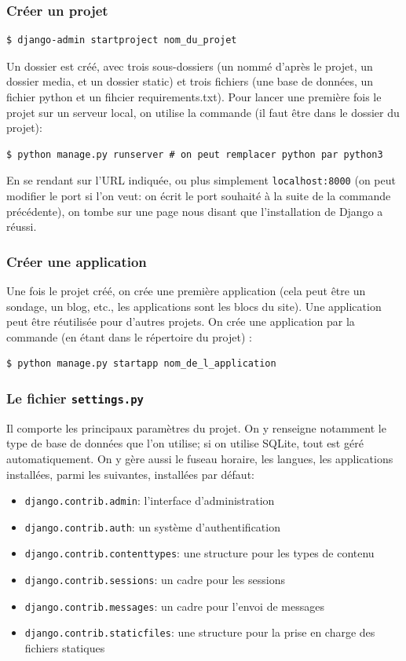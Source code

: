 \documentclass[a4paper, 10pt]{article}
\begin{document}
\subsubsection{Créer un projet}
\begin{verbatim}
$ django-admin startproject nom_du_projet
\end{verbatim}

Un dossier est créé, avec trois sous-dossiers (un nommé d'après le projet, un dossier media, et un dossier static) et trois fichiers (une base de données, un fichier python et un fihcier requirements.txt). Pour lancer une première fois le projet sur un serveur local, on utilise la commande (il faut être dans le dossier du projet):
\begin{verbatim}
$ python manage.py runserver # on peut remplacer python par python3
\end{verbatim}
En se rendant sur l’URL indiquée, ou plus simplement \texttt{localhost:8000} (on peut modifier le port si l'on veut: on écrit le port souhaité à la suite de la commande précédente), on tombe sur une page nous disant que l'installation de Django a réussi.

\subsubsection{Créer une application}
Une fois le projet créé, on crée une première application (cela peut être un sondage, un blog, etc., les applications sont les blocs du site). Une application peut être réutilisée pour d'autres projets. On crée une application par la commande (en étant dans le répertoire du projet) :
\begin{verbatim}
$ python manage.py startapp nom_de_l_application
\end{verbatim}

\subsubsection{Le fichier \texttt{settings.py}}
Il comporte les principaux paramètres du projet. On y renseigne notamment le type de base de données que l'on utilise; si on utilise SQLite, tout est géré automatiquement. On y gère aussi le fuseau horaire, les langues, les applications installées, parmi les suivantes, installées par défaut:
\begin{itemize}
    \item \texttt{django.contrib.admin}: l'interface d'administration
    \item \texttt{django.contrib.auth}: un système d'authentification
    \item \texttt{django.contrib.contenttypes}: une structure pour les types de contenu
    \item \texttt{django.contrib.sessions}: un cadre pour les sessions
    \item \texttt{django.contrib.messages}: un cadre pour l'envoi de messages
    \item \texttt{django.contrib.staticfiles}: une structure pour la prise en charge des fichiers statiques
\end{itemize}
\end{document}
